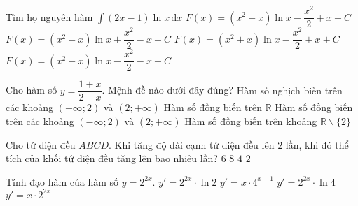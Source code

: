 \begin{ex}%
Tìm họ nguyên hàm $\displaystyle \int \limits(2x-1)\ln x \mathrm{\,d}x$	
	\choice
	{\True $F(x)=(x^2-x)\ln x-\dfrac{x^2}{2}+x+C$}
	{$F(x)=(x^2-x)\ln x+\dfrac{x^2}{2}-x+C$}
	{$F(x)=(x^2+x)\ln x-\dfrac{x^2}{2}+x+C$}
	{$F(x)=(x^2-x)\ln x-\dfrac{x^2}{2}-x+C$}
\end{ex}
\begin{ex}%
	Cho hàm số $y=\dfrac{1+x}{2-x}$. Mệnh đề nào dưới đây đúng?
	\choice
	{Hàm số nghịch biến trên các khoảng $(-\infty;2)$ và $(2;+\infty)$}
	{Hàm số đồng biến trên $\mathbb{R}$}
	{\True Hàm số đồng biến trên các khoảng $(-\infty;2)$ và $(2;+\infty)$}
	{Hàm số đồng biến trên khoảng $\mathbb{R}\backslash \{2\}$}
\end{ex}
\begin{ex}%
	Cho tứ diện đều $ABCD$. Khi tăng độ dài cạnh tứ diện đều lên $2$ lần, khi đó thể tích của khối tứ diện đều tăng lên bao nhiêu lần?
	\choice
	{$6 $} {\True $ 8$} {$4 $} {$ 2$}
	
\end{ex}
\begin{ex}%
Tính đạo hàm của hàm số $y=2^{2x}$.
\choice
{$y'=2^{2x}\cdot \ln 2$} {$y'=x\cdot 4^{x-1}$} {\True $y'=2^{2x}\cdot \ln 4$} {$y'=x\cdot 2^{2x}$}	
	
\end{ex}
